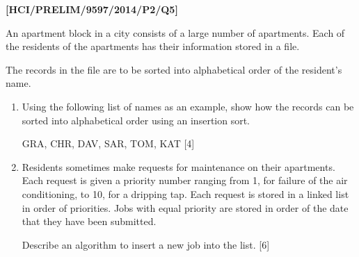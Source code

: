 \item \textbf{{[}HCI/PRELIM/9597/2014/P2/Q5{]} }

An apartment block in a city consists of a large number of apartments.
Each of the residents of the apartments has their information stored
in a file. 

The records in the file are to be sorted into alphabetical order of
the resident\textquoteright s name. 
\begin{enumerate}
\item Using the following list of names as an example, show how the records
can be sorted into alphabetical order using an insertion sort. 
\noindent \begin{center}
GRA, CHR, DAV, SAR, TOM, KAT \hfill{}{[}4{]}
\par\end{center}
\item Residents sometimes make requests for maintenance on their apartments.
Each request is given a priority number ranging from 1, for failure
of the air conditioning, to 10, for a dripping tap. Each request is
stored in a linked list in order of priorities. Jobs with equal priority
are stored in order of the date that they have been submitted. 

Describe an algorithm to insert a new job into the list. \hfill{}{[}6{]}
\end{enumerate}
